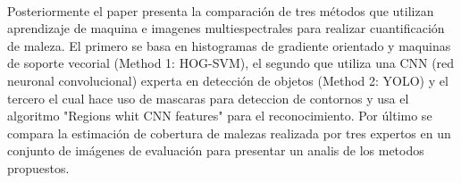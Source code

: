\documentclass[journal,article,submit,moreauthors,pdftex]{Definitions/mdpi}
\begin{document}
\\
Posteriormente el paper presenta la comparación de tres métodos que utilizan aprendizaje de maquina e imagenes multiespectrales para realizar cuantificación de maleza. El primero se basa en histogramas de gradiente orientado y maquinas de soporte vecorial (Method 1: HOG-SVM), el segundo que utiliza una CNN (red neuronal convolucional) experta en detección de objetos (Method 2: YOLO) y el tercero el cual hace uso de mascaras para deteccion de contornos  y usa el algoritmo "Regions whit CNN features" para el reconocimiento. Por último se compara la estimación de cobertura de malezas realizada por tres expertos en un conjunto de imágenes de evaluación para presentar un analis de los metodos propuestos.

\end{document}
